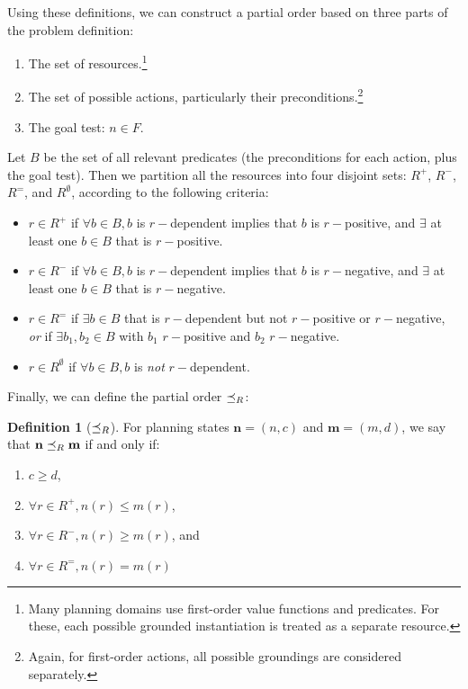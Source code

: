 \documentclass[letterpaper]{article}
\theoremstyle{plain} \newtheorem{theorem}{Theorem} \newtheorem{proposition}{Proposition} \newtheorem{lemma}{Lemma}
\theoremstyle{definition} \newtheorem{definition}{Definition} \newtheorem{conjecture}{Conjecture} \newtheorem*{example}{Example}
\theoremstyle{remark} \newtheorem*{remark}{Remark} \newtheorem*{note}{Note} \newtheorem{case}{Case}
\begin{document}
Using these definitions, we can construct a partial order based on three parts of the problem definition:
\begin{enumerate}
	\item The set of resources.\footnote{Many planning domains use first-order value functions and predicates. For these, each possible grounded instantiation is treated as a separate resource.}
	\item The set of possible actions, particularly their preconditions.\footnote{Again, for first-order actions, all possible groundings are considered separately.}
	\item The goal test: $n \in F$.
\end{enumerate}

Let $B$ be the set of all relevant predicates (the preconditions for each action, plus the goal test). Then we partition all the resources into four disjoint sets: $R^+$, $R^-$, $R^=$, and $R^\emptyset$, according to the following criteria:
\begin{itemize}
	\item $r \in R^+$ if $\forall b \in B, b$ is $r-$dependent implies that $b$ is $r-$positive, and $\exists$ at least one $b \in B$ that is $r-$positive.
	\item $r \in R^-$ if $\forall b \in B, b$ is $r-$dependent implies that $b$ is $r-$negative, and $\exists$ at least one $b \in B$ that is $r-$negative.
	\item $r \in R^=$ if $\exists b \in B$ that is $r-$dependent but not $r-$positive or $r-$negative, \emph{or} if $\exists b_1, b_2 \in B$ with $b_1$ $r-$positive and $b_2$ $r-$negative.
	\item $r \in R^\emptyset$ if $\forall b \in B, b$ is \emph{not} $r-$dependent.
\end{itemize}

Finally, we can define the partial order $\preceq_R$:
\begin{definition}[$\preceq_R$]
	\label{def-po}
	For planning states $\textbf{n} = (n, c)$ and $\textbf{m} = (m, d)$, we say that $\textbf{n} \preceq_R \textbf{m}$ if and only if:
	\begin{enumerate}
		\item $c \ge d$,
		\item $\forall r \in R^+, n(r) \le m(r)$,
		\item $\forall r \in R^-, n(r) \ge m(r)$, and
		\item $\forall r \in R^=, n(r) = m(r)$
	\end{enumerate}
\end{definition}
\end{document}
